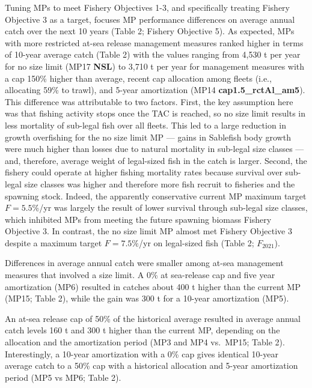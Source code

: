 \documentclass[11pt]{book}
\begin{document}
Tuning MPs to meet Fishery Objectives 1-3, and specifically treating Fishery Objective 3 as a target, focuses MP performance differences on average annual catch over the next 10 years (Table 2; Fishery Objective 5). As expected, MPs with more restricted at-sea release management measures ranked higher in terms of 10-year average catch (Table 2) with the values ranging from 4,530 t per year for no size limit (MP17 \textbf{NSL}) to 3,710 t per year for management measures with a cap 150\% higher than average, recent cap allocation among fleets (i.e., allocating 59\% to trawl), and 5-year amortization (MP14 \textbf{cap1.5\_rctAl\_am5}). This difference was attributable to two factors. First, the key assumption here was that fishing activity stops once the TAC is reached, so no size limit results in less mortality of sub-legal fish over all fleets. This led to a large reduction in growth overfishing for the no size limit MP --- gains in Sablefish body growth were much higher than losses due to natural mortality in sub-legal size classes --- and, therefore, average weight of legal-sized fish in the catch is larger. Second, the fishery could operate at higher fishing mortality rates because survival over sub-legal size classes was higher and therefore more fish recruit to fisheries and the spawning stock. Indeed, the apparently conservative current MP maximum target \(F=5.5\%\)/yr was largely the result of lower survival through sub-legal size classes, which inhibited MPs from meeting the future spawning biomass Fishery Objective 3. In contrast, the no size limit MP almost met Fishery Objective 3 despite a maximum target \(F=7.5\%\)/yr on legal-sized fish (Table 2; \(F_{2021}\)).

Differences in average annual catch were smaller among at-sea management measures that involved a size limit. A 0\% at sea-release cap and five year amortization (MP6) resulted in catches about 400 t higher than the current MP (MP15; Table 2), while the gain was 300 t for a 10-year amortization (MP5).

An at-sea release cap of 50\% of the historical average resulted in average annual catch levels 160 t and 300 t higher than the current MP, depending on the allocation and the amortization period (MP3 and MP4 vs.~MP15; Table 2). Interestingly, a 10-year amortization with a 0\% cap gives identical 10-year average catch to a 50\% cap with a historical allocation and 5-year amortization period (MP5 vs MP6; Table 2).
\end{document}
